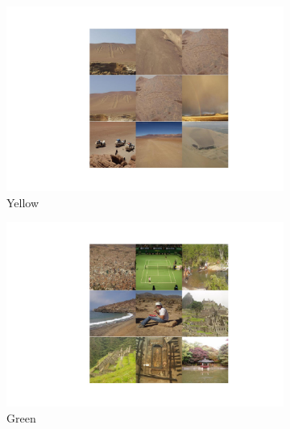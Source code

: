 \documentclass[letterpaper]{article}
\begin{document}
\begin{figure}[H]
  \centering
  \begin{subfigure}[b]{0.36\linewidth}
    \includegraphics[trim=5.5cm 5.5cm 5.5cm 5.5cm,clip=true,width=\linewidth]{outputs/report_figs/2.jpg}
     \caption{Yellow}
  \end{subfigure}
  \hspace*{-2.8em}
  \begin{subfigure}[b]{0.36\linewidth}
    \includegraphics[trim=5.5cm 5.5cm 5.5cm 5.5cm,clip=true,width=\linewidth]{outputs/report_figs/10.jpg}
    \caption{Green}
  \end{subfigure}
  \hspace*{-2.8em}
  \begin{subfigure}[b]{0.36\linewidth}

\end{subfigure}
\end{figure}
\end{document}
